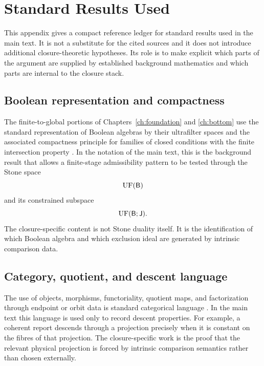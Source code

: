 \chapter{Standard Results Used}
\label{app:standard-results}
\begin{chapterorientation}
\end{chapterorientation}

This appendix gives a compact reference ledger for standard results used
in the main text.  It is not a substitute for the cited sources and it
does not introduce additional closure-theoretic hypotheses.  Its role is
to make explicit which parts of the argument are supplied by established
background mathematics and which parts are internal to the closure stack.

\section{Boolean representation and compactness}
\label{app:standard-boolean}
The finite-to-global portions of Chapters~\ref{ch:foundation} and
\ref{ch:bottom} use the standard representation of Boolean algebras by
their ultrafilter spaces and the associated compactness principle for
families of closed conditions with the finite intersection property
\cite{Stone1936,Rudin1987}.
In the notation of the main text, this is the background result that
allows a finite-stage admissibility pattern to be tested through the
Stone space
\[
	\operatorname{UF}(\mathsf B)
\]
and its constrained subspace
\[
	\operatorname{UF}(\mathsf B;\mathsf J).
\]
The closure-specific content is not Stone duality itself.  It is the
identification of which Boolean algebra and which exclusion ideal are
generated by intrinsic comparison data.

\section{Category, quotient, and descent language}
\label{app:standard-category}
The use of objects, morphisms, functoriality, quotient maps, and
factorization through endpoint or orbit data is standard categorical
language \cite{MacLane1998}.  In the main text this language is used
only to record descent properties.  For example, a coherent report
descends through a projection precisely when it is constant on the
fibres of that projection.  The closure-specific work is the proof that
the relevant physical projection is forced by intrinsic comparison
semantics rather than chosen externally.

